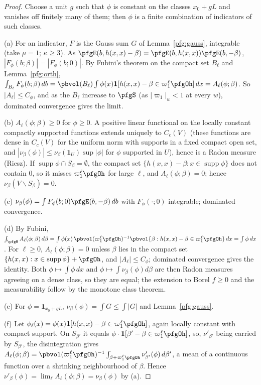 \documentclass[10pt]{amsart}
\theoremstyle{definition}
\theoremstyle{remark}
\begin{document}
\begin{proof}
Choose a unit $g$ such that $\phi$ is constant on the classes $x_0+gL$ and vanishes off finitely many of them; then
$\phi$ is a finite combination of indicators of such classes.

(a) For an indicator, $F$ is the Gauss sum $G$ of Lemma~\ref{pfg:gauss}, integrable (take $\mu=1$; $\kappa\ge3$).
As $\pfgE(b,h(x,x)-\beta)=\pfgE(b,h(x,x))\pfgE(b,-\beta)$, $|F_\phi(b;\beta)|=|F_\phi(b;0)|$. By Fubini's theorem on the
compact set $B_\ell$ and Lemma~\ref{pfg:orth}, $\int_{B_\ell}F_\phi(b;\beta)\,db=\pbvol(B_\ell)\int\phi(x)\mathbf 1[h(x,x)-\beta
\in\varpi_1^\ell\pfgOh]\,dx=A_\ell(\phi;\beta)$. So $|A_\ell|\le C_\phi$, and as the $B_\ell$ increase to $\pfgS$ (as
$|\varpi_1|_w<1$ at every $w$), dominated convergence gives the limit.

(b) $A_\ell(\phi;\beta)\ge0$ for $\phi\ge0$. A positive linear functional on the locally constant compactly supported
functions extends uniquely to $C_c(V)$ (these functions are dense in $C_c(V)$ for the uniform norm with supports in a
fixed compact open set, and $|\nu_\beta(\phi)|\le\nu_\beta(\mathbf 1_U)\sup|\phi|$ for $\phi$ supported in $U$), hence is a
Radon measure (Riesz). If $\operatorname{supp}\phi\cap S_\beta=\emptyset$, the compact set $\{h(x,x)-\beta:x\in
\operatorname{supp}\phi\}$ does not contain $0$, so it misses $\varpi_1^\ell\pfgOh$ for large $\ell$, and
$A_\ell(\phi;\beta)=0$; hence $\nu_\beta(V\smallsetminus S_\beta)=0$.

(c) $\nu_\beta(\phi)=\int F_\phi(b;0)\pfgE(b,-\beta)\,db$ with $F_\phi(\cdot;0)$ integrable; dominated convergence.

(d) By Fubini, $\int_{\pfgH}A_\ell(\phi;\beta)\,d\beta=\int\phi(x)\,\pbvol(\varpi_1^\ell\pfgOh)^{-1}\pbvol\{\beta:h(x,x)-\beta\in
\varpi_1^\ell\pfgOh\}\,dx=\int\phi\,dx$. For $\ell\ge0$, $A_\ell(\phi;\beta)=0$ unless $\beta$ lies in the compact set
$\{h(x,x):x\in\operatorname{supp}\phi\}+\pfgOh$, and $|A_\ell|\le C_\phi$; dominated convergence gives the identity. Both $\phi\mapsto\int\phi\,dx$ and
$\phi\mapsto\int\nu_\beta(\phi)d\beta$ are then Radon measures agreeing on a dense class, so they are equal; the
extension to Borel $f\ge0$ and the measurability follow by the monotone class theorem.

(e) For $\phi=\mathbf 1_{x_0+gL}$, $\nu_\beta(\phi)=\int G\le\int|G|$ and Lemma~\ref{pfg:gauss}.

(f) Let $\phi_\ell(x)=\phi(x)\mathbf 1[h(x,x)-\beta\in\varpi_1^\ell\pfgOh]$, again locally constant with compact support.
On $S_{\beta'}$ it equals $\phi\cdot\mathbf 1[\beta'-\beta\in\varpi_1^\ell\pfgOh]$, so, $\nu'_{\beta'}$ being carried by
$S_{\beta'}$, the disintegration gives $A_\ell(\phi;\beta)=\pbvol(\varpi_1^\ell\pfgOh)^{-1}\int_{\beta+\varpi_1^\ell\pfgOh}
\nu'_{\beta'}(\phi)\,d\beta'$, a mean of a continuous function over a shrinking neighbourhood of $\beta$. Hence
$\nu'_\beta(\phi)=\lim_\ell A_\ell(\phi;\beta)=\nu_\beta(\phi)$ by (a).
\end{proof}
\end{document}
